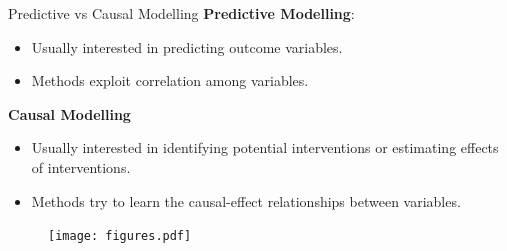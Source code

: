 \documentclass[aspectratio=169]{beamer}
\begin{document}
\begin{frame}{Predictive vs Causal Modelling}
	\textbf{Predictive Modelling}:
		\begin{itemize}
			\item Usually interested in predicting outcome variables.
			\item Methods exploit correlation among variables.
		\end{itemize}
	\vspace{1em}
	\textbf{Causal Modelling}
		\begin{itemize}
			\item Usually interested in identifying potential interventions or estimating effects of interventions.
			\item Methods try to learn the causal-effect relationships between variables.
		\end{itemize}

	\begin{figure}
		\centering
		\texttt{[image: figures.pdf]}
	\end{figure}
\end{frame}
\end{document}
